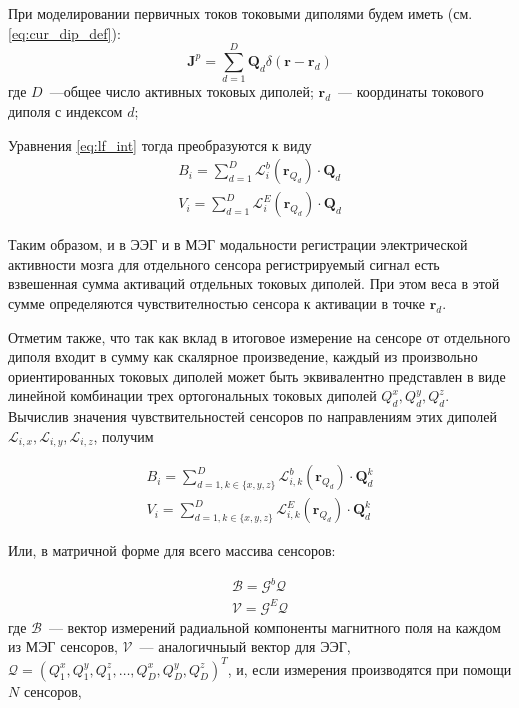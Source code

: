 При моделировании первичных токов токовыми диполями будем иметь (см. \ref{eq:cur_dip_def}):
\begin{equation}
    \mathbf{J}^p = \sum_{d=1}^D \mathbf{Q}_d \delta(\mathbf{r}-\mathbf{r}_d)
\end{equation}
где $D$~---общее число активных токовых диполей; $\mathbf{r}_d$~--- координаты токового
диполя с индексом $d$;

Уравнения \ref{eq:lf_int} тогда преобразуются к виду
\begin{gather}
    B_i = \sum_{d=1}^{D}\mathbf{\mathcal{L}}_i^b(\mathbf{r}_{Q_d})\cdot \mathbf{Q}_d\\
    V_i = \sum_{d=1}^{D}\mathbf{\mathcal{L}}_i^E(\mathbf{r}_{Q_d})\cdot \mathbf{Q}_d
\end{gather}

Таким образом, и в ЭЭГ и в МЭГ модальности регистрации электрической активности мозга
для отдельного сенсора регистрируемый сигнал есть взвешенная сумма активаций отдельных токовых диполей.
При этом веса в этой сумме определяются чувствителностью сенсора к активации в точке $\mathbf{r}_d$.

Отметим также, что так как вклад в итоговое измерение на сенсоре от отдельного диполя входит в сумму
как скалярное произведение, каждый из произвольно ориентированных токовых диполей
может быть эквивалентно представлен в виде линейной комбинации трех ортогональных токовых диполей
$Q_d^x, Q_d^y, Q_d^z$.
Вычислив значения чувствительностей сенсоров по направлениям этих диполей
$\mathcal{L}_{i,x}, \mathcal{L}_{i,y}, \mathcal{L}_{i,z}$, получим


\begin{gather}
    B_i = \sum_{d=1, k \in \{x,y,z\}}^{D}\mathbf{\mathcal{L}}_{i,k}^b(\mathbf{r}_{Q_d})\cdot \mathbf{Q}_d^k\\
    V_i = \sum_{d=1, k \in \{x,y,z\}}^{D}\mathbf{\mathcal{L}}_{i,k}^E(\mathbf{r}_{Q_d})\cdot \mathbf{Q}_d^k
\end{gather}

Или, в матричной форме для всего массива сенсоров:

\begin{gather}
    \mathcal{B} = \mathcal{G}^b \mathcal{Q} \\
    \mathcal{V} = \mathcal{G}^E \mathcal{Q}
    \label{eq:BV_generative_matrix}
\end{gather}
где $\mathcal{B}$~--- вектор измерений радиальной компоненты магнитного поля на каждом из МЭГ сенсоров,
$\mathcal{V}$~--- аналогичныый вектор для ЭЭГ,
$\mathcal{Q} = (Q_1^x, Q_1^y, Q_1^z, \ldots, Q_D^x, Q_D^y, Q_D^z)^T$, и, если измерения производятся при помощи
$N$ сенсоров,

